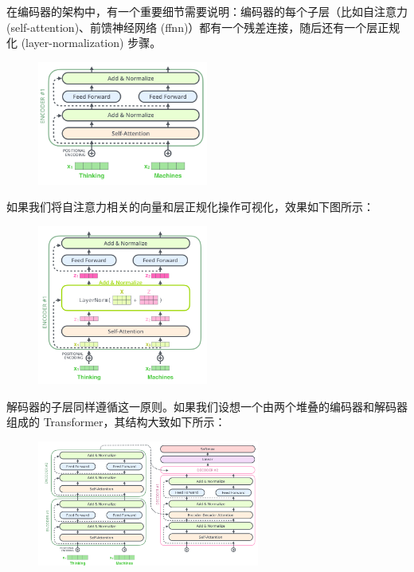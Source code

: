 \documentclass[cn,hazy,blue,10pt,normal]{elegantnote}
\begin{document}
在编码器的架构中，有一个重要细节需要说明：编码器的每个子层（比如自注意力 (self-attention)、前馈神经网络 (ffnn)）都有一个残差连接，随后还有一个层正规化 (layer-normalization) 步骤。

\begin{figure}[ht]
	\centering
	\includegraphics[width=0.5\textwidth]{image/transformer_resideual_layer_norm.png}
\end{figure}

如果我们将自注意力相关的向量和层正规化操作可视化，效果如下图所示：

\begin{figure}[ht]
	\centering
	\includegraphics[width=0.5\textwidth]{image/transformer_resideual_layer_norm_2.png}
\end{figure}

解码器的子层同样遵循这一原则。如果我们设想一个由两个堆叠的编码器和解码器组成的 Transformer，其结构大致如下所示：

\begin{figure}[ht]
	\centering
	\includegraphics[width=0.65\textwidth]{image/transformer_resideual_layer_norm_3.png}
\end{figure}
\end{document}
